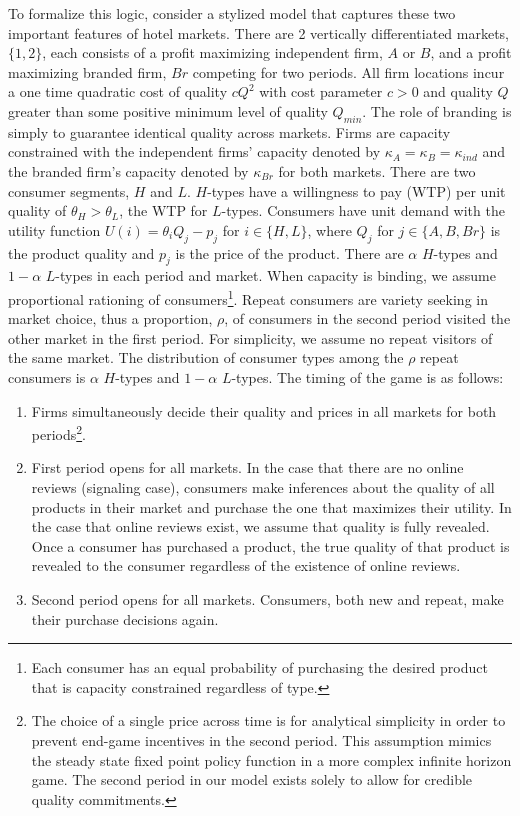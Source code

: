 \documentclass[mksc,blindrev]{informs3} %
\begin{document}
To formalize this logic, consider a  stylized model that captures these two important features of hotel markets. There are 2 vertically differentiated markets, $\{1,2\}$, each consists of a profit maximizing independent firm, $A$ or $B$, and a profit maximizing branded firm, $Br$ competing for two periods. All firm locations incur a one time quadratic cost of quality $cQ^2$ with cost parameter $c>0$ and quality $Q$ greater than some positive minimum level of quality $Q_{min}$. The role of branding is simply to guarantee identical quality across markets. Firms are capacity constrained with the independent firms' capacity denoted by $\kappa_{A}=\kappa_B=\kappa_{ind}$ and the branded firm's capacity denoted by $\kappa_{Br}$ for both markets. There are two consumer segments, $H$ and $L$. $H$-types have a willingness to pay (WTP) per unit quality of $\theta_H>\theta_L$, the WTP for $L$-types. Consumers have unit demand with the utility function $U(i)=\theta_iQ_j-p_j$ for $i \in\{H,L\}$, where $Q_j$ for $j\in\{A,B,Br\}$ is the product quality and $p_j$ is the price of the product. There are $\alpha$ $H$-types and $1-\alpha$ $L$-types in each period and market. When capacity is binding, we assume proportional rationing of consumers\footnote{Each consumer has an equal probability of purchasing the desired product that is capacity constrained regardless of type.}. Repeat consumers are variety seeking in market choice, thus a proportion, $\rho$, of consumers in the second period visited the other market in the first period. For simplicity, we assume no repeat visitors of the same market. The distribution of consumer types among the $\rho$ repeat consumers is $\alpha$ $H$-types and $1-\alpha$ $L$-types. The timing of the game is as follows:

\begin{enumerate}
\item Firms simultaneously decide their quality and prices in all markets for both periods\footnote{The choice of a single price across time is for analytical simplicity in order to prevent end-game incentives in the second period. This assumption mimics the steady state fixed point policy function in a more complex infinite horizon game. The second period in our model exists solely to allow for credible quality commitments.}. 
  \item First period opens for all markets. In the case that there are no online reviews (signaling case), consumers make inferences about the quality of all products in their market and purchase the one that maximizes their utility. In the case that online reviews exist, we assume that quality is fully revealed. Once a consumer has purchased a product, the true quality of that product is revealed to the consumer regardless of the existence of online reviews.
  \item Second period opens for all markets. Consumers, both new and repeat, make their purchase decisions again.
\end{enumerate}
\end{document}
